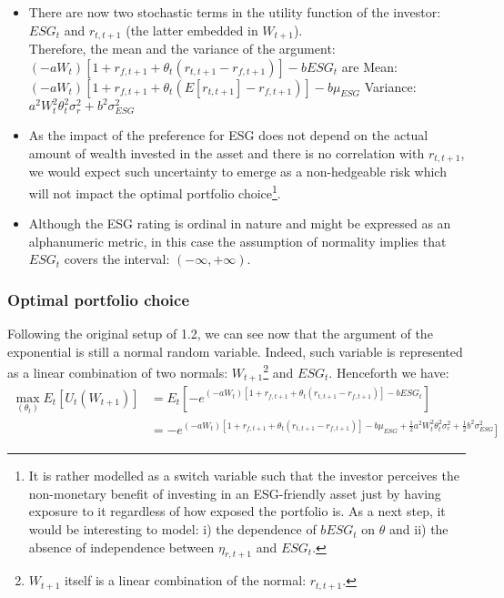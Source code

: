 \documentclass[12pt]{article}
\begin{document}
	\begin{itemize}
		\item There are now two stochastic terms in the utility function of the investor: $ESG_t$ and $r_{t,t+1}$ (the latter embedded in $W_{t+1}$).\\ Therefore, the mean and the variance of the argument: $(-aW_t) [1 + r_{f,t+1} + \theta_t(r_{t,t+1}-r_{f, t+1})] - bESG_t$ are
		\subitem Mean: $(-aW_t) [1 + r_{f,t+1} + \theta_t(E[r_{t,t+1}]-r_{f, t+1})] - b\mu_{ESG}$
		\subitem Variance: $a^2W_t^2\theta_t^2\sigma_r^2 + b^2\sigma_{ESG}^2$
		\item As the impact of the preference for ESG does not depend on the actual amount of wealth invested in the asset and there is no correlation with $r_{t,t+1}$, we would expect such uncertainty to emerge as a non-hedgeable risk which will not impact the optimal portfolio choice\footnote {It is rather modelled as a switch variable such that the investor perceives the non-monetary benefit of investing in an ESG-friendly asset just by having exposure to it regardless of how exposed the portfolio is. As a next step, it would be interesting to model: i) the dependence of $bESG_t$ on $\theta$ and ii) the absence of independence between $\eta_{r, t+1}$ and $ESG_t$.}.
		\item Although the ESG rating is ordinal in nature and might be expressed as an alphanumeric metric, in this case the assumption of normality implies that $ESG_t$ covers the interval: $(-\infty,+\infty )$.
	\end{itemize}
	
	\subsubsection{Optimal portfolio choice}
	Following the original setup of 1.2, we can see now that the argument of the exponential is still a normal random variable. Indeed, such variable is represented as a linear combination of two normals: $W_{t+1}$\footnote{$W_{t+1}$ itself is a linear combination of the normal: $r_{t,t+1}$.} and $ESG_t$. Henceforth we have: 
	\begin{align*}
		\max_{(\theta_t)} E_t[U_{t}(W_{t+1})] &= E_t[-e^{(-aW_t) [1 + r_{f,t+1} + \theta_t(r_{t,t+1}-r_{f, t+1})] - bESG_t}] \\
		&= -e^{(-aW_t) [1 + r_{f,t+1} + \theta_t(r_{t,t+1}-r_{f, t+1})] - b\mu_{ESG} +\frac{1}{2}a^2W_t^2\theta_t^2\sigma_r^2 + \frac{1}{2}b^2\sigma_{ESG}^2}]
	\end{align*} \vspace{-2em}
	
\end{document}
